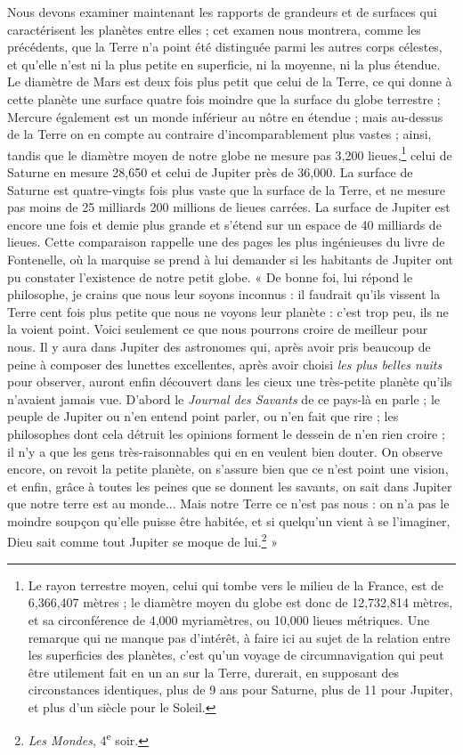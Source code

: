 \documentclass[a4paper, 11pt, oneside, landscape]{article}
\begin{document}
Nous devons examiner maintenant les rapports de grandeurs et de surfaces qui caractérisent les planètes entre elles ; cet examen nous montrera, comme les précédents, que la Terre n'a point été distinguée parmi les autres corps célestes, et qu'elle n'est ni la plus petite en superficie, ni la moyenne, ni la plus étendue. Le diamètre de Mars est deux fois plus petit que celui de la Terre, ce qui donne à cette planète une surface quatre fois moindre que la surface du globe terrestre ; Mercure également est un monde inférieur au nôtre en étendue ; mais au-dessus de la Terre on en compte au contraire d'incomparablement plus vastes ; ainsi, tandis que le diamètre moyen de notre globe ne mesure pas 3,200 lieues,\footnote{Le rayon terrestre moyen, celui qui tombe vers le milieu de la France, est de 6,366,407 mètres ; le diamètre moyen du globe est donc de 12,732,814 mètres, et sa circonférence de 4,000 myriamètres, ou 10,000 lieues métriques. Une remarque qui ne manque pas d'intérêt, à faire ici au sujet de la relation entre les superficies des planètes, c'est qu'un voyage de circumnavigation qui peut être utilement fait en un an sur la Terre, durerait, en supposant des circonstances identiques, plus de 9 ans pour Saturne, plus de 11 pour Jupiter, et plus d'un siècle pour le Soleil.} celui de Saturne en mesure 28,650 et celui de Jupiter près de 36,000. La surface de Saturne est quatre-vingts fois plus vaste que la surface de la Terre, et ne mesure pas moins de 25 milliards 200 millions de lieues carrées. La surface de Jupiter est encore une fois et demie plus grande et s'étend sur un espace de 40 milliards de lieues. Cette comparaison rappelle une des pages les plus ingénieuses du livre de Fontenelle, où la marquise se prend à lui demander si les habitants de Jupiter ont pu constater l'existence de notre petit globe. « De bonne foi, lui répond le philosophe, je crains que nous leur soyons inconnus : il faudrait qu'ils vissent la Terre cent fois plus petite que nous ne voyons leur planète : c'est trop peu, ils ne la voient point. Voici seulement ce que nous pourrons croire de meilleur pour nous. Il y aura dans Jupiter des astronomes qui, après avoir pris beaucoup de peine à composer des lunettes excellentes, après avoir choisi \emph{les plus belles nuits} pour observer, auront enfin découvert dans les cieux une très-petite planète qu'ils n'avaient jamais vue. D'abord le \emph{Journal des Savants} de ce pays-là en parle ; le peuple de Jupiter ou n'en entend point parler, ou n'en fait que rire ; les philosophes dont cela détruit les opinions forment le dessein de n'en rien croire ; il n'y a que les gens très-raisonnables qui en en veulent bien douter. On observe encore, on revoit la petite planète, on s'assure bien que ce n'est point une vision, et enfin, grâce à toutes les peines que se donnent les savants, on sait dans Jupiter que notre terre est au monde... Mais notre Terre ce n'est pas nous : on n'a pas le moindre soupçon qu'elle puisse être habitée, et si quelqu'un vient à se l'imaginer, Dieu sait comme tout Jupiter se moque de lui.\footnote{\emph{Les Mondes}, 4\textsuperscript{e} soir.} »
\end{document}
